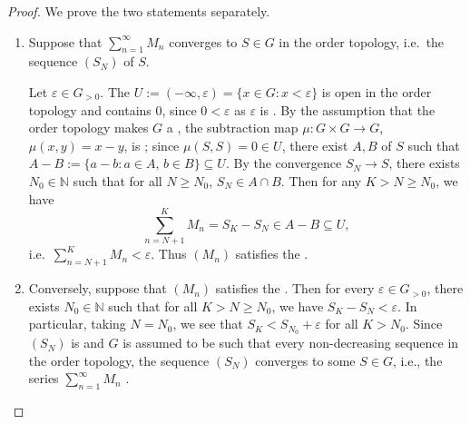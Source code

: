 \begin{proof}
    We prove the two statements separately.

    \begin{enumerate}
        \item Suppose that $\sum_{n=1}^\infty M_n$ converges to $S \in G$ in the order topology, i.e.\ the sequence $(S_N)$ of   $S$.

        Let $\varepsilon \in G_{>0}$. The  $U := (-\infty, \varepsilon) = \{x \in G : x < \varepsilon\}$ is open in the order topology and contains $0$, since $0 < \varepsilon$ as $\varepsilon$ is . By the assumption that the order topology makes $G$ a , the subtraction map $\mu : G \times G \to G$, $\mu(x, y) = x - y$, is ; since $\mu(S, S) = 0 \in U$, there exist  $A, B$ of $S$ such that $A - B := \{a - b : a \in A,\, b \in B\} \subseteq U$. By the convergence $S_N \to S$, there exists $N_0 \in \mathbb{N}$ such that for all $N \ge N_0$, $S_N \in A \cap B$. Then for any $K > N \ge N_0$, we have
        $$\sum_{n=N+1}^K M_n = S_K - S_N \in A - B \subseteq U,$$
        i.e.\ $\sum_{n=N+1}^K M_n < \varepsilon$. Thus $(M_n)$ satisfies the .

        \item Conversely, suppose that $(M_n)$ satisfies the . Then for every $\varepsilon \in G_{>0}$, there exists $N_0 \in \mathbb{N}$ such that for all $K > N \ge N_0$, we have $S_K - S_N < \varepsilon$. In particular, taking $N = N_0$, we see that $S_K < S_{N_0} + \varepsilon$ for all $K > N_0$. Since $(S_N)$ is  and $G$ is assumed to be such that every non-decreasing  sequence  in the order topology, the sequence $(S_N)$ converges to some $S \in G$, i.e., the series $\sum_{n=1}^\infty M_n$ .


\end{enumerate}
\end{proof}
